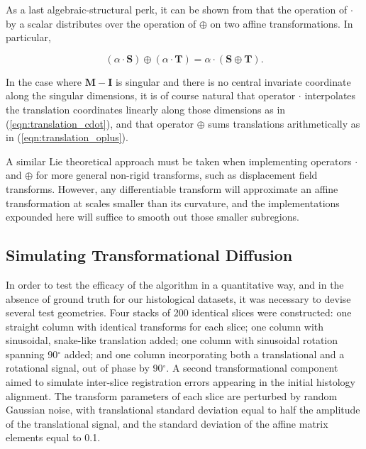         As a last algebraic-structural perk, it can be shown from  that the operation of $\cdot$ by a scalar distributes over the operation of $\oplus$ on two affine transformations. In particular,
        
        \begin{equation}
          (\alpha \cdot \mathbf{S}) \oplus (\alpha \cdot \mathbf{T}) = \alpha \cdot (\mathbf{S} \oplus \mathbf{T}).
        \end{equation}
        
        In the case where $\mathbf{M} - \mathbf{I}$ is singular and there is no central invariate coordinate along the singular dimensions, it is of course natural that operator $\cdot$ interpolates the translation coordinates linearly along those dimensions as in (\ref{eqn:translation_cdot}), and that operator $\oplus$ sums translations arithmetically as in (\ref{eqn:translation_oplus}).
        
        A similar Lie theoretical approach must be taken when implementing operators $\cdot$ and $\oplus$ for more general non-rigid transforms, such as displacement field transforms. However, any differentiable transform will approximate an affine transformation at scales smaller than its curvature, and the implementations expounded here will suffice to smooth out those smaller subregions.
	
  \subsection{Simulating Transformational Diffusion} %
  \label{sub:simulating_transformational_diffusion}
    In order to test the efficacy of the algorithm in a quantitative way, and in the absence of ground truth for our histological datasets, it was necessary to devise several test geometries. Four stacks of 200 identical slices were constructed: one straight column with identical transforms for each slice; one column with sinusoidal, snake-like translation added; one column with sinusoidal rotation spanning 90$^{\circ}$ added; and one column incorporating both a translational and a rotational signal, out of phase by 90$^{\circ}$. A second transformational component aimed to simulate inter-slice registration errors appearing in the initial histology alignment. The transform parameters of each slice are perturbed by random Gaussian noise, with translational standard deviation equal to half the amplitude of the translational signal, and the standard deviation of the affine matrix elements equal to 0.1.
  
